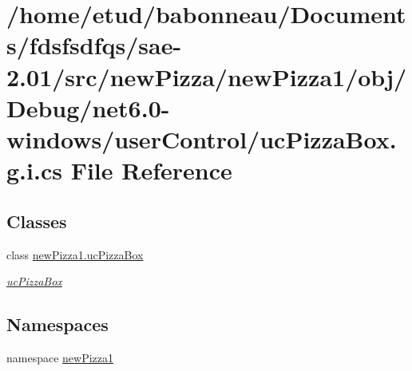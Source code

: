 \hypertarget{net6_80-windows_2userControl_2ucPizzaBox_8g_8i_8cs}{}\section{/home/etud/babonneau/\+Documents/fdsfsdfqs/sae-\/2.01/src/new\+Pizza/new\+Pizza1/obj/\+Debug/net6.0-\/windows/user\+Control/uc\+Pizza\+Box.g.\+i.\+cs File Reference}
\label{net6_80-windows_2userControl_2ucPizzaBox_8g_8i_8cs}
\subsection*{Classes}
\begin{DoxyCompactItemize}
\item 
class \hyperlink{classnewPizza1_1_1ucPizzaBox}{new\+Pizza1.\+uc\+Pizza\+Box}
\begin{DoxyCompactList}\small\item\em \hyperlink{classnewPizza1_1_1ucPizzaBox}{uc\+Pizza\+Box} \end{DoxyCompactList}\end{DoxyCompactItemize}
\subsection*{Namespaces}
\begin{DoxyCompactItemize}
\item 
namespace \hyperlink{namespacenewPizza1}{new\+Pizza1}
\end{DoxyCompactItemize}
